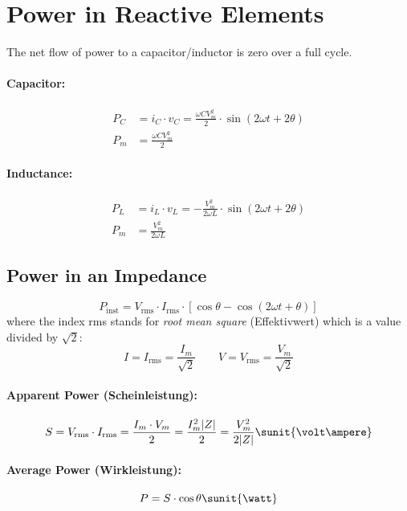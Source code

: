 
\section{Power in Reactive Elements} %
	The net flow of power to a capacitor/inductor is zero over a full cycle.
	
	\paragraph{Capacitor:} %
		\begin{align*}
			P_C &= i_C \cdot v_C = \frac{\omega CV_m^2}{2}\cdot \sin(2\omega t + 2 \theta) \\
			P_m &= \frac{\omega C V_m^2}{2}
		\end{align*}
	\paragraph{Inductance:} %
		\begin{align*}
			P_L &= i_L \cdot v_L = - \frac{V_m^2}{2 \omega L} \cdot \sin(2\omega t + 2\theta) \\
			P_m &= \frac{V_m^2}{2\omega L}
		\end{align*}
	\subsection{Power in an Impedance} %
		\[
			P_\text{inst} = V_{\text{rms}} \cdot I_{\text{rms}} \cdot \left[\cos\theta - \cos(2\omega t + \theta)\right]
		\]
		where the index rms stands for \emph{root mean square} (Effektivwert) which is a value divided by $\sqrt 2$:
		\[
			I = I_{\text{rms}} = \frac{I_m}{\sqrt 2} \qquad V = V_{\text{rms}} = \frac{V_m}{\sqrt 2}
		\]
		
		\paragraph{Apparent Power (Scheinleistung):} %
			\[
				S = V_{\text{rms}} \cdot I_{\text{rms}} = \frac{I_m\cdot V_m}{2} = \frac{I_m^2 |Z|}{2} = \frac{V_m^2}{2|Z|} \sunit{\volt\ampere}
			\]
		\paragraph{Average Power (Wirkleistung):} %
			\[
				P = S \cdot \cos \theta \sunit{\watt}
			\]
